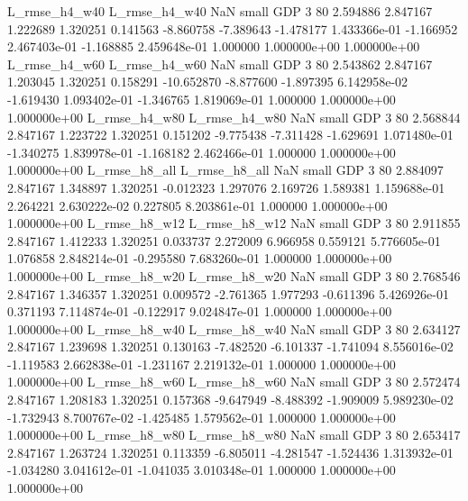  L_rmse_h4_w40  L_rmse_h4_w40                   NaN      small      GDP                 3 80 2.594886       2.847167 1.222689       1.320251    0.141563     -8.860758     -7.389643    -1.478177   1.433366e-01 -1.166952 2.467403e-01    -1.168885   2.459648e-01            1.000000    1.000000e+00        1.000000e+00
 L_rmse_h4_w60  L_rmse_h4_w60                   NaN      small      GDP                 3 80 2.543862       2.847167 1.203045       1.320251    0.158291    -10.652870     -8.877600    -1.897395   6.142958e-02 -1.619430 1.093402e-01    -1.346765   1.819069e-01            1.000000    1.000000e+00        1.000000e+00
 L_rmse_h4_w80  L_rmse_h4_w80                   NaN      small      GDP                 3 80 2.568844       2.847167 1.223722       1.320251    0.151202     -9.775438     -7.311428    -1.629691   1.071480e-01 -1.340275 1.839978e-01    -1.168182   2.462466e-01            1.000000    1.000000e+00        1.000000e+00
 L_rmse_h8_all  L_rmse_h8_all                   NaN      small      GDP                 3 80 2.884097       2.847167 1.348897       1.320251   -0.012323      1.297076      2.169726     1.589381   1.159688e-01  2.264221 2.630222e-02     0.227805   8.203861e-01            1.000000    1.000000e+00        1.000000e+00
 L_rmse_h8_w12  L_rmse_h8_w12                   NaN      small      GDP                 3 80 2.911855       2.847167 1.412233       1.320251    0.033737      2.272009      6.966958     0.559121   5.776605e-01  1.076858 2.848214e-01    -0.295580   7.683260e-01            1.000000    1.000000e+00        1.000000e+00
 L_rmse_h8_w20  L_rmse_h8_w20                   NaN      small      GDP                 3 80 2.768546       2.847167 1.346357       1.320251    0.009572     -2.761365      1.977293    -0.611396   5.426926e-01  0.371193 7.114874e-01    -0.122917   9.024847e-01            1.000000    1.000000e+00        1.000000e+00
 L_rmse_h8_w40  L_rmse_h8_w40                   NaN      small      GDP                 3 80 2.634127       2.847167 1.239698       1.320251    0.130163     -7.482520     -6.101337    -1.741094   8.556016e-02 -1.119583 2.662838e-01    -1.231167   2.219132e-01            1.000000    1.000000e+00        1.000000e+00
 L_rmse_h8_w60  L_rmse_h8_w60                   NaN      small      GDP                 3 80 2.572474       2.847167 1.208183       1.320251    0.157368     -9.647949     -8.488392    -1.909009   5.989230e-02 -1.732943 8.700767e-02    -1.425485   1.579562e-01            1.000000    1.000000e+00        1.000000e+00
 L_rmse_h8_w80  L_rmse_h8_w80                   NaN      small      GDP                 3 80 2.653417       2.847167 1.263724       1.320251    0.113359     -6.805011     -4.281547    -1.524436   1.313932e-01 -1.034280 3.041612e-01    -1.041035   3.010348e-01            1.000000    1.000000e+00        1.000000e+00
